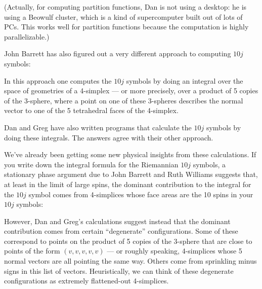 \documentclass{article}
\def\tightlist{}
\renewcommand{\texttt}[1]{%
  \begingroup
  \ttfamily
  \begingroup\lccode`~=`/\lowercase{\endgroup\def~}{/\discretionary{}{}{}}%
  \begingroup\lccode`~=`[\lowercase{\endgroup\def~}{[\discretionary{}{}{}}%
  \begingroup\lccode`~=`.\lowercase{\endgroup\def~}{.\discretionary{}{}{}}%
  \catcode`/=\active\catcode`[=\active\catcode`.=\active
  \scantokens{#1\noexpand}%
  \endgroup
}
\begin{document}
(Actually, for computing partition functions, Dan is not using a
desktop: he is using a Beowulf cluster, which is a kind of supercomputer
built out of lots of PCs. This works well for partition functions
because the computation is highly parallelizable.)

John Barrett has also figured out a very different approach to computing
\(10j\) symbols:


In this approach one computes the \(10j\) symbols by doing an integral
over the space of geometries of a 4-simplex --- or more precisely, over
a product of 5 copies of the 3-sphere, where a point on one of these
3-spheres describes the normal vector to one of the 5 tetrahedral faces
of the 4-simplex.

Dan and Greg have also written programs that calculate the \(10j\)
symbols by doing these integrals. The answers agree with their other
approach.

We've already been getting some new physical insights from these
calculations. If you write down the integral formula for the Riemannian
\(10j\) symbols, a stationary phase argument due to John Barrett and
Ruth Williams suggests that, at least in the limit of large spins, the
dominant contribution to the integral for the \(10j\) symbol comes from
4-simplices whose face areas are the 10 spins in your \(10j\) symbols:


However, Dan and Greg's calculations suggest instead that the dominant
contribution comes from certain ``degenerate'' configurations. Some of
these correspond to points on the product of 5 copies of the 3-sphere
that are close to points of the form \((v,v,v,v,v)\) --- or roughly
speaking, 4-simplices whose 5 normal vectors are all pointing the same
way. Others come from sprinkling minus signs in this list of vectors.
Heuristically, we can think of these degenerate configurations as
extremely flattened-out 4-simplices.
\end{document}
